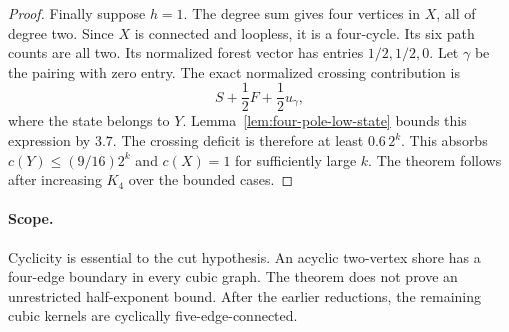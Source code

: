 \begin{proof}
Finally suppose $h=1$.
The degree sum gives four vertices in $X$, all of degree two.
Since $X$ is connected and loopless, it is a four-cycle.
Its six path counts are all two.
Its normalized forest vector has entries $1/2,1/2,0$.
Let $\gamma$ be the pairing with zero entry.
The exact normalized crossing contribution is
\[
 S+\frac12F+\frac12u_\gamma,
\]
where the state belongs to $Y$.
Lemma~\ref{lem:four-pole-low-state} bounds this expression by $3.7$.
The crossing deficit is therefore at least $0.6\,2^k$.
This absorbs $c(Y)\le(9/16)2^k$ and $c(X)=1$ for sufficiently large $k$.
The theorem follows after increasing $K_4$ over the bounded cases.
\end{proof}

\paragraph{Scope.}
Cyclicity is essential to the cut hypothesis.
An acyclic two-vertex shore has a four-edge boundary in every cubic graph.
The theorem does not prove an unrestricted half-exponent bound.
After the earlier reductions, the remaining cubic kernels are cyclically
five-edge-connected.
